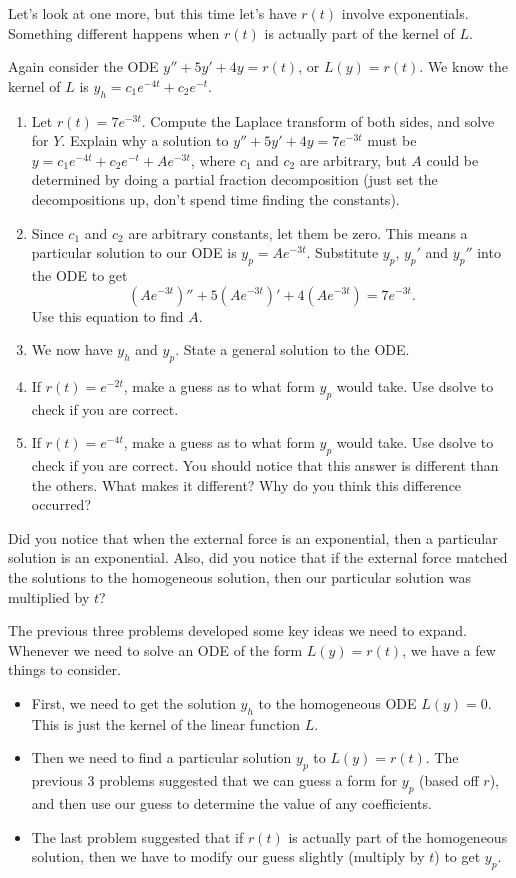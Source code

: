 Let's look at one more, but this time let's have $r(t)$ involve exponentials. Something different happens when $r(t)$ is actually part of the kernel of $L$. 
\begin{problem}
Again consider the ODE $y''+5y'+4y=r(t)$, or $L(y)=r(t)$. We know the kernel of $L$ is $y_h = c_1 e^{-4t}+c_2e^{-t}$.\begin{enumerate}
 \item Let $r(t)=7e^{-3t}$.  Compute the Laplace transform of both sides, and solve for $Y$. Explain why a solution to $y''+5y'+4y=7e^{-3t}$ must be $y=c_1 e^{-4t}+c_2e^{-t}+Ae^{-3t}$, where $c_1$ and $c_2$ are arbitrary, but $A$ could be determined by doing a partial fraction decomposition (just set the decompositions up, don't spend time finding the constants).
 \item Since $c_1$ and $c_2$ are arbitrary constants, let them be zero. This means a particular solution to our ODE is $y_p=Ae^{-3t}$.  Substitute $y_p$, $y_p'$ and $y_p''$ into the ODE to get
$$
(Ae^{-3t})'' + 5(Ae^{-3t})'+4(Ae^{-3t})=7e^{-3t}
.$$ Use this equation to find $A$.
 \item We now have $y_h$ and $y_p$. State a general solution to the ODE. 
 \item If $r(t) = e^{-2t}$, make a guess as to what form $y_p$ would take.  Use dsolve to check if you are correct. 
 \item If $r(t) = e^{-4t}$, make a guess as to what form $y_p$ would take.  Use dsolve to check if you are correct. You should notice that this answer is different than the others. What makes it different? Why do you think this difference occurred?
\end{enumerate}
 
\end{problem}
Did you notice that when the external force is an exponential, then a particular solution is an exponential. Also, did you notice that if the external force matched the solutions to the homogeneous solution, then our particular solution was multiplied by $t$?

The previous three problems developed some key ideas we need to expand. Whenever we need to solve an ODE of the form $L(y)=r(t)$, we have a few things to consider.
\begin{itemize}
 \item First, we need to get the solution $y_h$ to the homogeneous ODE $L(y)=0$.  This is just the kernel of the linear function $L$. 
 \item Then we need to find a particular solution $y_p$ to $L(y)=r(t)$. The previous 3 problems suggested that we can guess a form for $y_p$ (based off $r$), and then use our guess to determine the value of any coefficients. 
 \item The last problem suggested that if $r(t)$ is actually part of the homogeneous solution, then we have to modify our guess slightly (multiply by $t$) to get $y_p$. 
\end{itemize}

